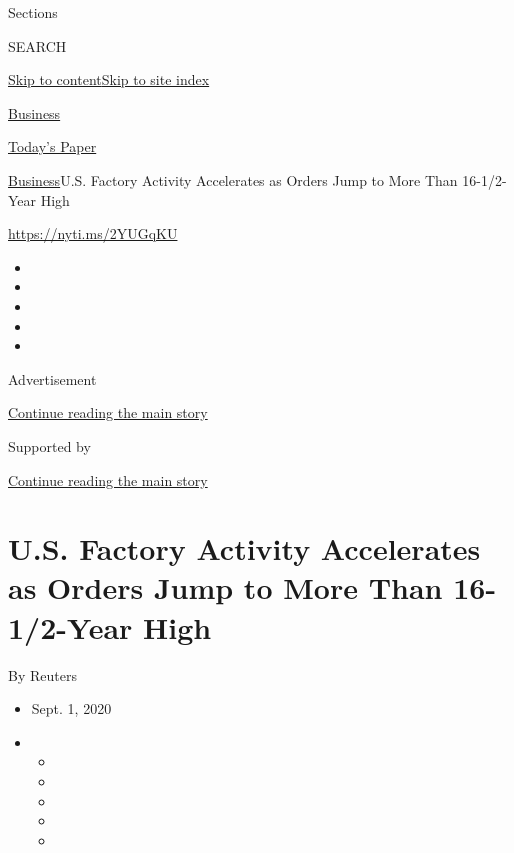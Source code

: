 Sections

SEARCH

\protect\hyperlink{site-content}{Skip to
content}\protect\hyperlink{site-index}{Skip to site index}

\href{https://www.nytimes3xbfgragh.onion/section/business}{Business}

\href{https://myaccount.nytimes3xbfgragh.onion/auth/login?response_type=cookie\&client_id=vi}{}

\href{https://www.nytimes3xbfgragh.onion/section/todayspaper}{Today's
Paper}

\href{/section/business}{Business}\textbar{}U.S. Factory Activity
Accelerates as Orders Jump to More Than 16-1/2-Year High

\url{https://nyti.ms/2YUGqKU}

\begin{itemize}
\item
\item
\item
\item
\item
\end{itemize}

Advertisement

\protect\hyperlink{after-top}{Continue reading the main story}

Supported by

\protect\hyperlink{after-sponsor}{Continue reading the main story}

\hypertarget{us-factory-activity-accelerates-as-orders-jump-to-more-than-16-12-year-high}{%
\section{U.S. Factory Activity Accelerates as Orders Jump to More Than
16-1/2-Year
High}\label{us-factory-activity-accelerates-as-orders-jump-to-more-than-16-12-year-high}}

By Reuters

\begin{itemize}
\item
  Sept. 1, 2020
\item
  \begin{itemize}
  \item
  \item
  \item
  \item
  \item
  \end{itemize}
\end{itemize}

